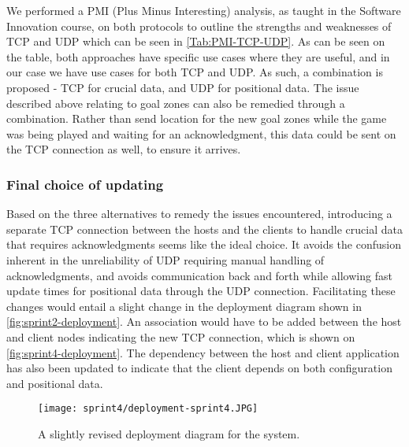 We performed a PMI (Plus Minus Interesting) analysis, as taught in the Software Innovation course, on both protocols to outline the strengths and weaknesses of TCP and UDP which can be seen in \autoref{Tab:PMI-TCP-UDP}.
As can be seen on the table, both approaches have specific use cases where they are useful, and in our case we have use cases for both TCP and UDP.
As such, a combination is proposed - TCP for crucial data, and UDP for positional data.
The issue described above relating to goal zones can also be remedied through a combination.
Rather than send location for the new goal zones while the game was being played and waiting for an acknowledgment, this data could be sent on the TCP connection as well, to ensure it arrives.

\subsubsection{Final choice of updating}
Based on the three alternatives to remedy the issues encountered, introducing a separate TCP connection between the hosts and the clients to handle crucial data that requires acknowledgments seems like the ideal choice.
It avoids the confusion inherent in the unreliability of UDP requiring manual handling of acknowledgments, and avoids communication back and forth while allowing fast update times for positional data through the UDP connection.
Facilitating these changes would entail a slight change in the deployment diagram shown in \autoref{fig:sprint2-deployment}.
An association would have to be added between the host and client nodes indicating the new TCP connection, which is shown on \autoref{fig:sprint4-deployment}.
The dependency between the host and client application has also been updated to indicate that the client depends on both configuration and positional data.
\begin{figure}[H]
    \centering
    \texttt{[image: sprint4/deployment-sprint4.JPG]}
    \caption{A slightly revised deployment diagram for the system.}
    \label{fig:sprint4-deployment}
\end{figure}
\noindent
